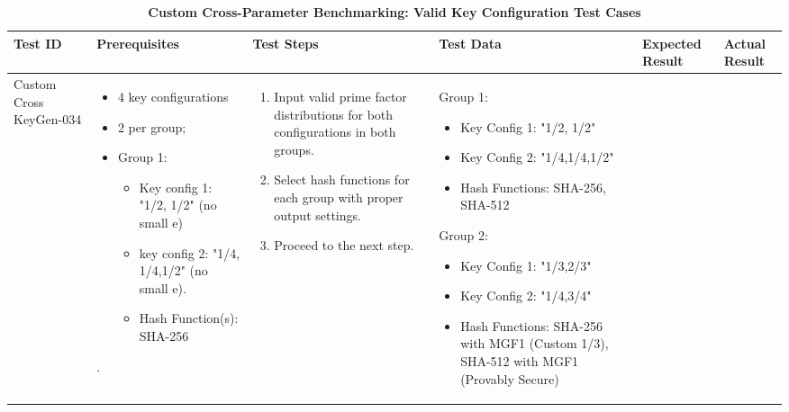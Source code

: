 \documentclass[]{final_report}
\theoremstyle{definition}
\begin{document}
\begin{longtable}{|p{1.5cm}|p{2.5cm}|p{3.5cm}|p{3.0cm}|p{3cm}|p{2cm}|}
  \caption{\textbf{Custom Cross-Parameter Benchmarking: Valid Key Configuration Test Cases}} \\
  \hline
  \textbf{Test ID} & \textbf{Prerequisites} & \textbf{Test Steps} & \textbf{Test Data} & \textbf{Expected Result} & \textbf{Actual Result} \\
  \hline
  Custom
  Cross
  KeyGen-034 &   \begin{itemize}
  \item 4 key configurations
  \item 2 per group; 
  \item Group 1: 
    \begin{itemize}
 \item Key config 1: "1/2, 1/2" (no small e) 
 \item key config 2:  "1/4,
 1/4,1/2" (no small e). 
 \item Hash Function(s): SHA-256
    \end{itemize}
  \end{itemize}. & 
  \begin{enumerate}
    \item Input valid prime factor distributions for both configurations in both groups.
    \item Select hash functions for each group with proper output settings.
    \item Proceed to the next step.
  \end{enumerate} & 
  Group 1:
\begin{itemize}
  \item Key Config 1: "1/2, 1/2"
  \item Key Config 2: "1/4,1/4,1/2"
  \item Hash Functions: SHA-256, SHA-512
\end{itemize}

Group 2:
\begin{itemize}
  \item Key Config 1: "1/3,2/3"
  \item Key Config 2: "1/4,3/4"
  \item Hash Functions: SHA-256 with MGF1 (Custom 1/3), SHA-512 with MGF1 (Provably Secure)
\end{itemize}


\end{longtable}
\end{document}
